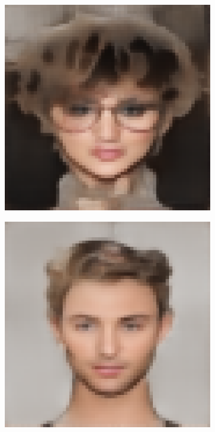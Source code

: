 \documentclass{IEEEcsmag}
\begin{document}
\begin{figure}[ht]
\begin{subfigure}{0.12\textwidth}
    \end{subfigure}
    \begin{subfigure}{0.12\textwidth}
        \includegraphics[width=\linewidth]{Digital sketches/generated_images/image8.jpeg_CVAE.png}
    \end{subfigure}
    \begin{subfigure}{0.12\textwidth}
        \includegraphics[width=\linewidth]{Digital sketches/generated_images/image11.jpeg_CVAE.png}

\end{subfigure}
\end{figure}
\end{document}
